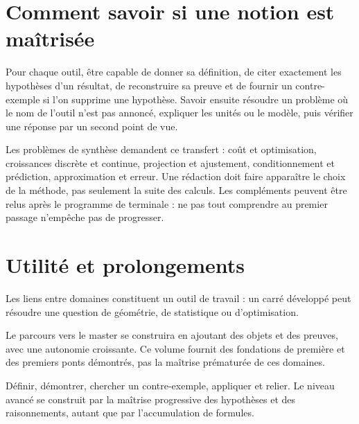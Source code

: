 \documentclass[../cours_1re.tex]{subfiles}
\begin{document}
\begin{finchapitre}
\section{Comment savoir si une notion est maîtrisée}
Pour chaque outil, être capable de donner sa définition, de citer exactement
les hypothèses d'un résultat, de reconstruire sa preuve et de fournir un
contre-exemple si l'on supprime une hypothèse.
Savoir ensuite résoudre un problème où le nom de l'outil n'est pas annoncé,
expliquer les unités ou le modèle, puis vérifier une réponse par un second point de vue.

Les problèmes de synthèse demandent ce transfert : coût et optimisation,
croissances discrète et continue, projection et ajustement, conditionnement
et prédiction, approximation et erreur. Une rédaction doit faire apparaître
le choix de la méthode, pas seulement la suite des calculs.
Les compléments peuvent être relus après le programme de terminale :
ne pas tout comprendre au premier passage n'empêche pas de progresser.


\section{Utilité et prolongements}
Les liens entre domaines constituent un outil de travail : un carré
développé peut résoudre une question de géométrie, de statistique ou d'optimisation.

Le parcours vers le master se construira en ajoutant des objets et des preuves,
avec une autonomie croissante. Ce volume fournit des fondations de première
et des premiers ponts démontrés, pas la maîtrise prématurée de ces domaines.
\begin{retenir}
Définir, démontrer, chercher un contre-exemple, appliquer et relier.
Le niveau avancé se construit par la maîtrise progressive des hypothèses
et des raisonnements, autant que par l'accumulation de formules.
\end{retenir}
\end{finchapitre}
\end{document}
